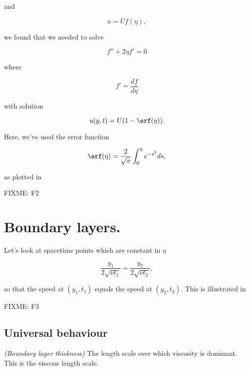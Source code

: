 and 

\begin{equation}\label{eqn:continuumL17:n}
u = U f(\eta),
\end{equation}

we found that we needed to solve

\begin{equation}\label{eqn:continuumL17:n}
f'' + 2 \eta f' = 0
\end{equation}

where 

\begin{equation}\label{eqn:continuumL17:n}
f' = \frac{df}{d\eta}
\end{equation}

with solution

\begin{equation}\label{eqn:continuumL17:n}
u(y, t) = U(1 - \erf(\eta)).
\end{equation}

Here, we've used the error function

\begin{equation}\label{eqn:continuumL17:n}
\erf(\eta) = \frac{2}{\sqrt{\pi}} \int_0^\eta e^{-s^2} ds,
\end{equation}

as plotted in

FIXME: F2

\section{Boundary layers.}

Let's look at spacetime points which are constant in $\eta$

\begin{equation}\label{eqn:continuumL17:n}
\frac{y_1}{2 \sqrt{\nu t_1}} = \frac{y_2}{2 \sqrt{\nu t_2}},
\end{equation}

so that the speed at $(y_1, t_1)$ equals the speed at $(y_2, t_2)$.  This is illustrated in

FIXME: F3

\subsection{Universal behaviour}

\begin{definition}
\emph{(Boundary layer thickness)}
\label{dfn:continuumL17:n}
The length scale over which viscosity is dominant.  This is the viscous length scale.
\end{definition}

